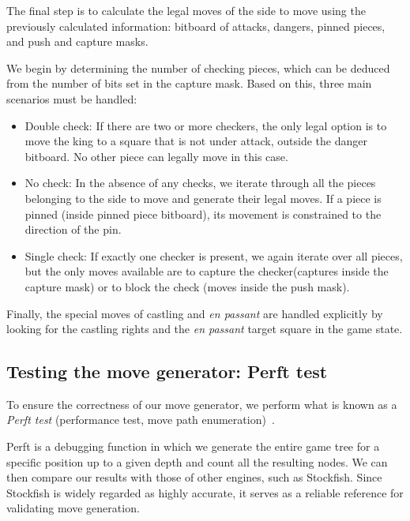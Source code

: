 \noindent The final step is to calculate the legal moves of the side to move using the previously calculated information: bitboard of attacks, dangers, pinned pieces, and push and capture masks.

\vspace{1em}

\noindent We begin by determining the number of checking pieces, which can be deduced from the number of bits set in the capture mask. Based on this, three main scenarios must be handled:

\begin{itemize}[itemsep=1pt]
    \item Double check: If there are two or more checkers, the only legal option is to move the king to a square that is not under attack, outside the danger bitboard. No other piece can legally move in this case.
    \item No check: In the absence of any checks, we iterate through all the pieces belonging to the side to move and generate their legal moves. If a piece is pinned (inside pinned piece bitboard), its movement is constrained to the direction of the pin.
    \item Single check: If exactly one checker is present, we again iterate over all pieces, but the only moves available are to capture the checker(captures inside the capture mask) or to block the check (moves inside the push mask).
\end{itemize}

\noindent Finally, the special moves of castling and \textit{en passant} are handled explicitly by looking for the castling rights and the \textit{en passant} target square in the game state.

\subsection{Testing the move generator: Perft test}

To ensure the correctness of our move generator, we perform what is known as a \textit{Perft test} (performance test, move path enumeration)~\cite{Perft}.

\vspace{1em}

\noindent Perft is a debugging function in which we generate the entire game tree for a specific position up to a given depth and count all the resulting nodes. We can then compare our results with those of other engines, such as Stockfish. Since Stockfish is widely regarded as highly accurate, it serves as a reliable reference for validating move generation.

